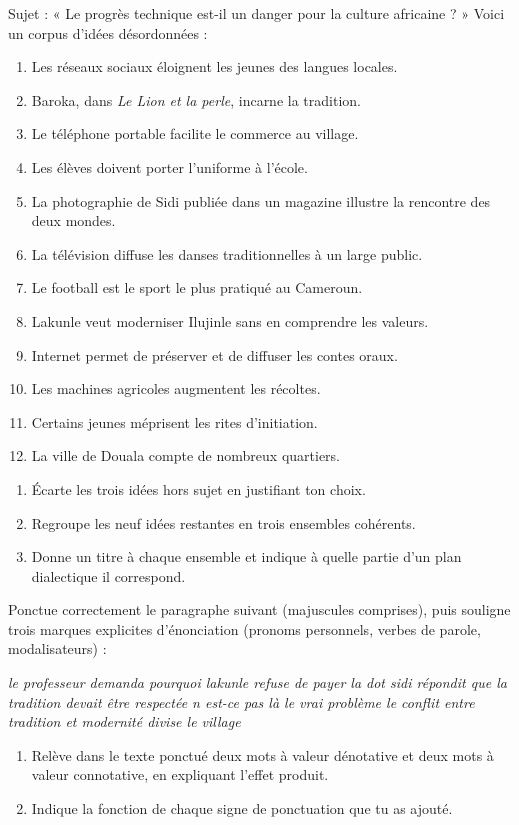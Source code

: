 \documentclass[11pt]{article}
\begin{document}
\begin{exercice}
Sujet : « Le progrès technique est-il un danger pour la culture africaine ? » Voici un corpus d'idées désordonnées :
\begin{enumerate}
\item Les réseaux sociaux éloignent les jeunes des langues locales.
\item Baroka, dans \emph{Le Lion et la perle}, incarne la tradition.
\item Le téléphone portable facilite le commerce au village.
\item Les élèves doivent porter l'uniforme à l'école.
\item La photographie de Sidi publiée dans un magazine illustre la rencontre des deux mondes.
\item La télévision diffuse les danses traditionnelles à un large public.
\item Le football est le sport le plus pratiqué au Cameroun.
\item Lakunle veut moderniser Ilujinle sans en comprendre les valeurs.
\item Internet permet de préserver et de diffuser les contes oraux.
\item Les machines agricoles augmentent les récoltes.
\item Certains jeunes méprisent les rites d'initiation.
\item La ville de Douala compte de nombreux quartiers.
\end{enumerate}
\begin{enumerate}
\item Écarte les trois idées hors sujet en justifiant ton choix.
\item Regroupe les neuf idées restantes en trois ensembles cohérents.
\item Donne un titre à chaque ensemble et indique à quelle partie d'un plan dialectique il correspond.
\end{enumerate}
\end{exercice}

\begin{exercice}
Ponctue correctement le paragraphe suivant (majuscules comprises), puis souligne trois marques explicites d'énonciation (pronoms personnels, verbes de parole, modalisateurs) :

\emph{le professeur demanda pourquoi lakunle refuse de payer la dot sidi répondit que la tradition devait être respectée n est-ce pas là le vrai problème le conflit entre tradition et modernité divise le village}

\begin{enumerate}
\item Relève dans le texte ponctué deux mots à valeur dénotative et deux mots à valeur connotative, en expliquant l'effet produit.
\item Indique la fonction de chaque signe de ponctuation que tu as ajouté.
\end{enumerate}
\end{exercice}
\end{document}
